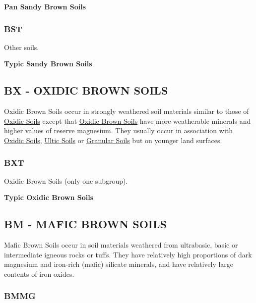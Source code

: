\documentclass[
  letterpaper,
  DIV=11,
  numbers=noendperiod]{scrreprt}
\begin{document}
\textbf{Pan Sandy Brown Soils}

\hypertarget{sec-key-BST}{%
\subsubsection{\texorpdfstring{\textbf{BST}}{BST}}\label{sec-key-BST}}

Other soils.

\textbf{Typic Sandy Brown Soils}

\hypertarget{sec-BX}{%
\subsection{\texorpdfstring{\textbf{BX} - OXIDIC BROWN
SOILS}{BX - OXIDIC BROWN SOILS}}\label{sec-BX}}

Oxidic Brown Soils occur in strongly weathered soil materials similar to
those of \protect\hyperlink{sec-X}{Oxidic Soils} except that
\protect\hyperlink{sec-BX}{Oxidic Brown Soils} have more weatherable
minerals and higher values of reserve magnesium. They usually occur in
association with \protect\hyperlink{sec-X}{Oxidic Soils},
\protect\hyperlink{sec-U}{Ultic Soils} or
\protect\hyperlink{sec-N}{Granular Soils} but on younger land surfaces.

\hypertarget{sec-key-BXT}{%
\subsubsection{\texorpdfstring{\textbf{BXT}}{BXT}}\label{sec-key-BXT}}

Oxidic Brown Soils (only one subgroup).

\textbf{Typic Oxidic Brown Soils}

\hypertarget{sec-BM}{%
\subsection{\texorpdfstring{\textbf{BM} - MAFIC BROWN
SOILS}{BM - MAFIC BROWN SOILS}}\label{sec-BM}}

Mafic Brown Soils occur in soil materials weathered from ultrabasic,
basic or intermediate igneous rocks or tuffs. They have relatively high
proportions of dark magnesium and iron-rich (mafic) silicate minerals,
and have relatively large contents of iron oxides.

\hypertarget{sec-key-BMMG}{%
\subsubsection{\texorpdfstring{\textbf{BMMG}}{BMMG}}\label{sec-key-BMMG}}
\end{document}
